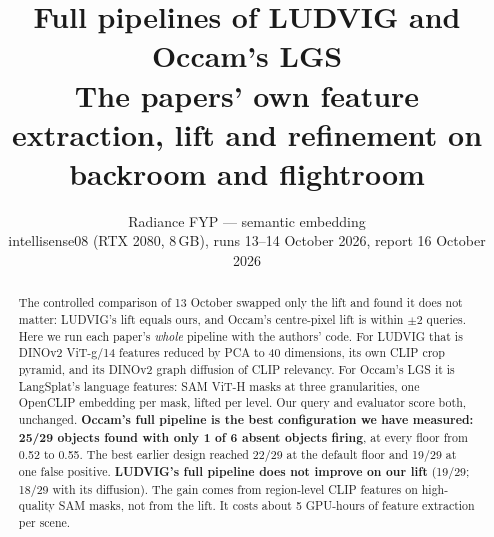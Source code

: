 \documentclass[11pt,a4paper]{article}
\title{\textbf{Full pipelines of LUDVIG and Occam's LGS}\\[2pt]
\large The papers' own feature extraction, lift and refinement on backroom and flightroom}
\author{Radiance FYP --- semantic embedding\\ \small intellisense08 (RTX 2080, 8\,GB), runs 13--14 October 2026, report 16 October 2026}
\date{}
\begin{document}
\maketitle

\begin{abstract}
\noindent The controlled comparison of 13 October swapped only the lift and found it does not matter: LUDVIG's lift equals
ours, and Occam's centre-pixel lift is within $\pm2$ queries. Here we run each paper's \emph{whole} pipeline with the
authors' code. For LUDVIG that is DINOv2 ViT-g/14 features reduced by PCA to 40 dimensions, its own CLIP crop pyramid,
and its DINOv2 graph diffusion of CLIP relevancy. For Occam's LGS it is LangSplat's language features: SAM ViT-H masks at
three granularities, one OpenCLIP embedding per mask, lifted per level. Our query and evaluator score both, unchanged.
\textbf{Occam's full pipeline is the best configuration we have measured: 25/29 objects found with only 1 of 6 absent
objects firing}, at every floor from 0.52 to 0.55. The best earlier design reached 22/29 at the default floor
and 19/29 at one false positive. \textbf{LUDVIG's full pipeline does not improve on our lift} (19/29; 18/29 with its
diffusion). The gain comes from region-level CLIP features on high-quality SAM masks, not from the lift. It costs about
5 GPU-hours of feature extraction per scene.
\end{abstract}

\tableofcontents
\bigskip
\end{document}
